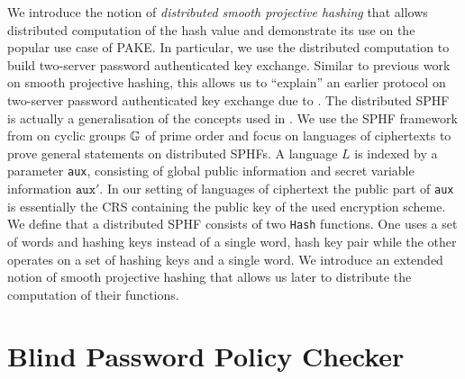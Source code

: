We introduce the notion of \emph{distributed smooth projective hashing} that allows distributed computation of the hash value and demonstrate its use on the popular use case of \acl{PAKE}.
In particular, we use the distributed computation to build two-server password authenticated key exchange.
Similar to previous work on smooth projective hashing, this allows us to ``explain'' an earlier protocol on two-server password authenticated key exchange due to \citeauthor{Katz2012a} \cite{Katz2012a}.
The distributed \ac{SPHF} is actually a generalisation of the concepts used in \cite{Katz2012a}.
We use the \ac{SPHF} framework from \cite{Benhamouda2013} on cyclic groups $\mathbb{G}$ of prime order and focus on languages of ciphertexts to prove general statements on distributed \acp{SPHF}.
A language $L$ is indexed by a parameter \texttt{aux}, consisting of global public information and secret variable information $\mathtt{aux}'$.
In our setting of languages of ciphertext the public part of \texttt{aux} is essentially the \ac{CRS} containing the public key of the used encryption scheme.
We define that a distributed \ac{SPHF} consists of two \texttt{Hash} functions.
One uses a set of words and hashing keys instead of a single word, hash key pair while the other operates on a set of hashing keys and a single word.
We introduce an extended notion of smooth projective hashing that allows us later to distribute the computation of their functions.

\section{Blind Password Policy Checker} \label{sec:policies}
